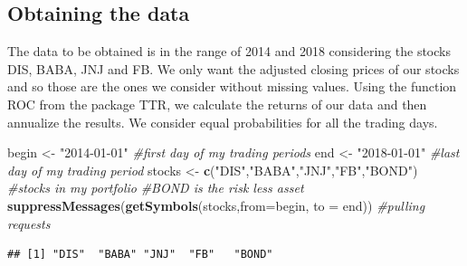 \documentclass[]{article}
\newenvironment{Shaded}{\begin{snugshade}}{\end{snugshade}}
\newcommand{\KeywordTok}[1]{\textcolor[rgb]{0.13,0.29,0.53}{\textbf{#1}}}
\newcommand{\DataTypeTok}[1]{\textcolor[rgb]{0.13,0.29,0.53}{#1}}
\newcommand{\StringTok}[1]{\textcolor[rgb]{0.31,0.60,0.02}{#1}}
\newcommand{\CommentTok}[1]{\textcolor[rgb]{0.56,0.35,0.01}{\textit{#1}}}
\newcommand{\NormalTok}[1]{#1}
\begin{document}
\subsection{Obtaining the data}\label{obtaining-the-data}

The data to be obtained is in the range of 2014 and 2018 considering the
stocks DIS, BABA, JNJ and FB. We only want the adjusted closing prices
of our stocks and so those are the ones we consider without missing
values. Using the function ROC from the package TTR, we calculate the
returns of our data and then annualize the results. We consider equal
probabilities for all the trading days.

\begin{Shaded}
\begin{Highlighting}[]
\NormalTok{begin <-}\StringTok{ "2014-01-01"} \CommentTok{#first day of my trading periods}
\NormalTok{end <-}\StringTok{ "2018-01-01"} \CommentTok{#last day of my trading period}
\NormalTok{stocks <-}\StringTok{ }\KeywordTok{c}\NormalTok{(}\StringTok{"DIS"}\NormalTok{,}\StringTok{"BABA"}\NormalTok{,}\StringTok{"JNJ"}\NormalTok{,}\StringTok{"FB"}\NormalTok{,}\StringTok{"BOND"}\NormalTok{) }\CommentTok{#stocks in my portfolio}
\CommentTok{#BOND is the risk less asset}
\KeywordTok{suppressMessages}\NormalTok{(}\KeywordTok{getSymbols}\NormalTok{(stocks,}\DataTypeTok{from=}\NormalTok{begin, }\DataTypeTok{to =}\NormalTok{ end)) }\CommentTok{#pulling requests}
\end{Highlighting}
\end{Shaded}

\begin{verbatim}
## [1] "DIS"  "BABA" "JNJ"  "FB"   "BOND"
\end{verbatim}
\end{document}
